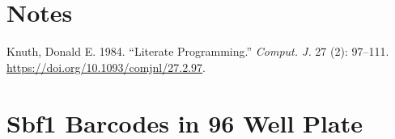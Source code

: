 \documentclass[
  letterpaper,
  DIV=11,
  numbers=noendperiod]{scrreprt}
\newlength{\cslhangindent}
\newlength{\cslentryspacingunit} %
\newenvironment{CSLReferences}[2] %
 {%
  \setlength{\parindent}{0pt}
  \ifodd #1
  \let\oldpar\par
  \def\par{\hangindent=\cslhangindent\oldpar}
  \fi
  \setlength{\parskip}{#2\cslentryspacingunit}
 }%
 {}
\begin{document}
\hypertarget{notes}{%
\chapter*{Notes}\label{notes}}


\hypertarget{refs}{}
\begin{CSLReferences}{1}{0}
\leavevmode{}%
Knuth, Donald E. 1984. {``Literate Programming.''} \emph{Comput. J.} 27
(2): 97--111. \url{https://doi.org/10.1093/comjnl/27.2.97}.

\end{CSLReferences}

\cleardoublepage
{}
{}
\appendix

\hypertarget{sbf1-barcodes-in-96-well-plate}{%
\chapter{Sbf1 Barcodes in 96 Well
Plate}\label{sbf1-barcodes-in-96-well-plate}}
\end{document}

